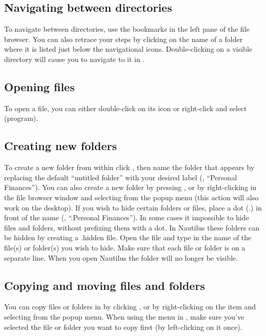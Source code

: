 
\subsection{Navigating between directories}
To navigate between directories, use the bookmarks in the left pane of the  file
browser. You can also retrace your steps by clicking on the name of a folder where it is listed just below the navigational icons. Double-clicking on a visible directory will cause you to navigate to it in .

\subsection{Opening files}
To open a file, you can either double-click on its icon or right-click and select 
(program).

\subsection{Creating new folders}
To create a new folder from within  click , then name the folder that appears by replacing the default ``untitled folder'' with your desired label (\eg, ``Personal Finances''). You can also create a new folder by pressing , or by right-clicking in the file browser window and selecting  from the popup menu (this action will also work on the desktop). If you wish to hide certain folders or files, place a dot (.) in front of the  name (\ie, ``.Personal Finances''). In some cases it impossible to hide files and folders, without prefixing them with a dot. In Nautilus these folders can be hidden by creating a .hidden file. Open the file and type in the name of the file(s) or  folder(s) you wish to hide. Make sure that each file or folder is on a separate line. When you open Nautilus the folder will no longer be visible.

\subsection{Copying and moving files and folders}
You can copy files or folders in  by clicking , or by right-clicking on the item and selecting  from the popup menu. When using the  menu in , make sure you've selected the file or folder you want to copy first (by left-clicking on it once). 

